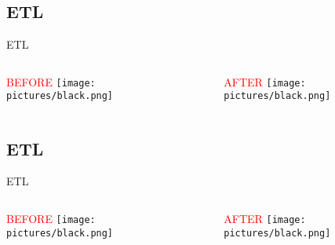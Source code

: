 \subsection{ETL}
\begin{frame}{ETL}

\begin{columns}

\begin{column}{0.49\textwidth}
\begin{center}
\textcolor{red}{BEFORE}
%
\texttt{[image: pictures/black.png]}
\end{center}
\end{column}

\begin{column}{.02\textwidth}
\rule{.1mm}{0.7\textheight}
\end{column}

\begin{column}{0.49\textwidth}
\begin{center}
\textcolor{red}{AFTER}
%
\texttt{[image: pictures/black.png]}
\end{center}
\end{column}
\end{columns}

\end{frame}
\subsection{ETL}
\begin{frame}{ETL}

\begin{columns}

\begin{column}{0.49\textwidth}
\begin{center}
\textcolor{red}{BEFORE}
%
\texttt{[image: pictures/black.png]}
\end{center}
\end{column}

\begin{column}{.02\textwidth}
\rule{.1mm}{0.7\textheight}
\end{column}

\begin{column}{0.49\textwidth}
\begin{center}
\textcolor{red}{AFTER}
%
\texttt{[image: pictures/black.png]}
\end{center}
\end{column}
\end{columns}

\end{frame}
